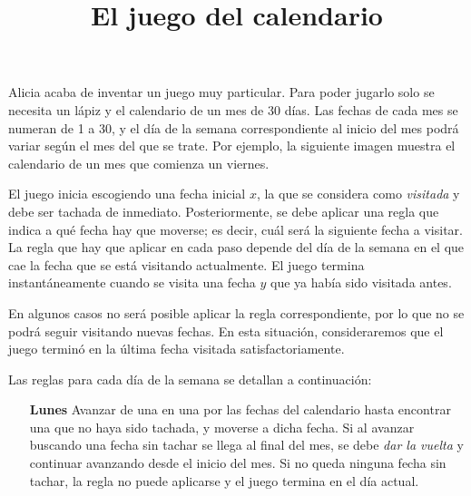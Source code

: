 \documentclass{oci}
\title{El juego del calendario}
\begin{document}
\begin{problemDescription}
  Alicia acaba de inventar un juego muy particular.
  Para poder jugarlo solo se necesita un lápiz y el calendario de un mes de 30 días.
  Las fechas de cada mes se numeran de 1 a 30, y el día de la semana correspondiente al inicio del mes 
  podrá variar según el mes del que se trate. 
  Por ejemplo, la siguiente imagen muestra el calendario de un mes que comienza un viernes.
  \begin{center}
  \end{center}

  El juego inicia escogiendo una fecha inicial $x$, la que se considera como \emph{visitada} y debe ser tachada de inmediato.
  Posteriormente, se debe aplicar una regla que indica a qué fecha hay que moverse; es decir, cuál será la siguiente fecha a visitar. 
  La regla que hay que aplicar en cada paso depende del día de la semana en el que cae la fecha que se está visitando actualmente.
  El juego termina instantáneamente cuando se visita una fecha $y$ que ya había sido visitada antes.
  
  En algunos casos no será posible aplicar la regla correspondiente, por lo que no se podrá seguir visitando nuevas fechas. En esta situación, 
  consideraremos que el juego terminó en la última fecha visitada satisfactoriamente.
  
  
  Las reglas para cada día de la semana se detallan a continuación:
  \begin{itemize}
   \item[\bf Lunes] Avanzar de una en una por las fechas del calendario hasta encontrar una que no haya sido tachada, y moverse a dicha fecha.
    Si al avanzar buscando una fecha sin tachar se llega al final del mes, se debe \emph{dar la vuelta} y continuar avanzando desde el inicio del mes.
    Si no queda ninguna fecha sin tachar, la regla no puede aplicarse y el juego termina en el día actual.


\end{itemize}
\end{problemDescription}
\end{document}
